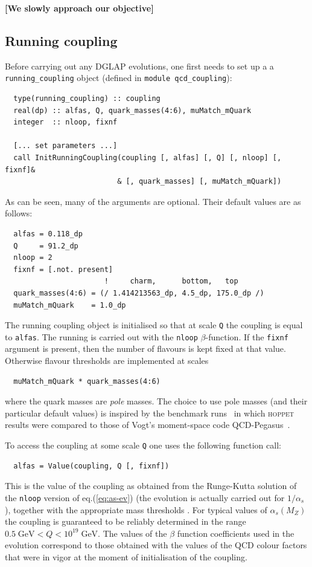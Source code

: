 \documentclass[12pt]{article}
\newcommand{\GeV}{\;\mathrm{GeV}}
\newcommand{\as}{\alpha_s}
\newcommand{\comment}[1]{\textbf{[#1]}}
\newcommand{\hoppet}{\textsc{hoppet}\xspace}
\newcommand{\ttt}[1]{\texttt{#1}}
\begin{document}
\comment{We slowly approach our objective}


\subsection{Running coupling}
\label{sec:run-coupl}

Before carrying out any DGLAP evolutions, one first needs to set up a
a \ttt{running\_coupling} object (defined in \ttt{module
  qcd\_coupling}):
\begin{verbatim}
  type(running_coupling) :: coupling
  real(dp) :: alfas, Q, quark_masses(4:6), muMatch_mQuark
  integer  :: nloop, fixnf

  [... set parameters ...]
  call InitRunningCoupling(coupling [, alfas] [, Q] [, nloop] [, fixnf]&
                          & [, quark_masses] [, muMatch_mQuark])
\end{verbatim}
As can be seen, many of the arguments are optional. Their default
values are as follows:
\begin{verbatim}
  alfas = 0.118_dp
  Q     = 91.2_dp
  nloop = 2
  fixnf = [.not. present]
                       !     charm,      bottom,   top
  quark_masses(4:6) = (/ 1.414213563_dp, 4.5_dp, 175.0_dp /)
  muMatch_mQuark    = 1.0_dp
\end{verbatim}
The running coupling object is initialised so that at scale \ttt{Q}
the coupling is equal to \ttt{alfas}. The running is carried out with
the \ttt{nloop} $\beta$-function. If the \ttt{fixnf} argument is
present, then the number of flavours is kept fixed at that
value. Otherwise flavour thresholds are implemented at scales
\begin{verbatim}
  muMatch_mQuark * quark_masses(4:6)
\end{verbatim}
where the quark masses are \emph{pole} masses. The choice to use pole
masses (and their particular default values) is inspired by the
benchmark runs~\cite{Benchmarks} in which \hoppet results were
compared to those of Vogt's moment-space code
QCD-Pegasus~\cite{Pegasus}.

To access the coupling at some scale \ttt{Q} one uses the following
function call:
\begin{verbatim}
  alfas = Value(coupling, Q [, fixnf])
\end{verbatim}
This is the value of the coupling as obtained from the Runge-Kutta
solution of the \ttt{nloop} version of eq.(\ref{eq:as-ev}) (the
evolution is actually carried out for $1/\as$), together with the
appropriate mass thresholds \cite{coupling_mass_thresholds}. For
typical values of $\as(M_Z)$ the coupling is guaranteed to be reliably
determined in the range $0.5 \GeV < Q < 10^{19}\GeV$. The values of
the $\beta$ function coefficients used in the evolution correspond to
those obtained with the values of the QCD colour factors that were in
vigor at the moment of initialisation of the coupling.
\end{document}
